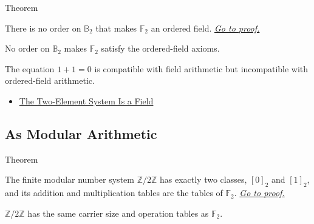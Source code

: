 \begin{theorembox}{Theorem}
\begin{theorem}
\label{thm:two-element-system-not-ordered-field}
There is no order on \(\mathbb{B}_2\) that makes
\(\mathbb{F}_2\) an ordered field.
\hyperref[prf:two-element-system-not-ordered-field]{\textit{Go to proof.}}
\end{theorem}
\end{theorembox}

\begin{remark*}
No order on \(\mathbb{B}_2\) makes \(\mathbb{F}_2\) satisfy the ordered-field axioms.
\end{remark*}

\begin{remark*}[Interpretation]
The equation \(1+1=0\) is compatible with field arithmetic but incompatible with ordered-field arithmetic.
\end{remark*}


\begin{dependencies}
\begin{itemize}
  \item \hyperref[thm:two-element-system-is-field]{The Two-Element System Is a Field}
\end{itemize}
\end{dependencies}

\subsection*{As Modular Arithmetic}

\begin{theorembox}{Theorem}
\begin{theorem}
\label{thm:z-mod-two-is-two-element-system}
The finite modular number system \(\mathbb{Z}/2\mathbb{Z}\) has exactly two
classes, \([0]_2\) and \([1]_2\), and its addition and multiplication tables
are the tables of \(\mathbb{F}_2\).
\hyperref[prf:z-mod-two-is-two-element-system]{\textit{Go to proof.}}
\end{theorem}
\end{theorembox}

\begin{remark*}
\(\mathbb{Z}/2\mathbb{Z}\) has the same carrier size and operation tables as
\(\mathbb{F}_2\).
\end{remark*}


